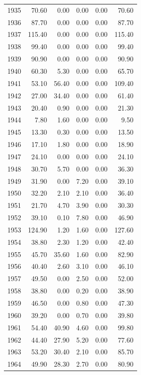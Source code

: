 \documentclass[12pt,]{article}
\begin{document}
\begin{longtable}{rrrrrr}
  1935 & 70.60 & 0.00 & 0.00 & 0.00 & 70.60 \\ 
  1936 & 87.70 & 0.00 & 0.00 & 0.00 & 87.70 \\ 
  1937 & 115.40 & 0.00 & 0.00 & 0.00 & 115.40 \\ 
  1938 & 99.40 & 0.00 & 0.00 & 0.00 & 99.40 \\ 
  1939 & 90.90 & 0.00 & 0.00 & 0.00 & 90.90 \\ 
  1940 & 60.30 & 5.30 & 0.00 & 0.00 & 65.70 \\ 
  1941 & 53.10 & 56.40 & 0.00 & 0.00 & 109.40 \\ 
  1942 & 27.00 & 34.40 & 0.00 & 0.00 & 61.40 \\ 
  1943 & 20.40 & 0.90 & 0.00 & 0.00 & 21.30 \\ 
  1944 & 7.80 & 1.60 & 0.00 & 0.00 & 9.50 \\ 
  1945 & 13.30 & 0.30 & 0.00 & 0.00 & 13.50 \\ 
  1946 & 17.10 & 1.80 & 0.00 & 0.00 & 18.90 \\ 
  1947 & 24.10 & 0.00 & 0.00 & 0.00 & 24.10 \\ 
  1948 & 30.70 & 5.70 & 0.00 & 0.00 & 36.30 \\ 
  1949 & 31.90 & 0.00 & 7.20 & 0.00 & 39.10 \\ 
  1950 & 32.20 & 2.10 & 2.10 & 0.00 & 36.40 \\ 
  1951 & 21.70 & 4.70 & 3.90 & 0.00 & 30.30 \\ 
  1952 & 39.10 & 0.10 & 7.80 & 0.00 & 46.90 \\ 
  1953 & 124.90 & 1.20 & 1.60 & 0.00 & 127.60 \\ 
  1954 & 38.80 & 2.30 & 1.20 & 0.00 & 42.40 \\ 
  1955 & 45.70 & 35.60 & 1.60 & 0.00 & 82.90 \\ 
  1956 & 40.40 & 2.60 & 3.10 & 0.00 & 46.10 \\ 
  1957 & 49.50 & 0.00 & 2.50 & 0.00 & 52.00 \\ 
  1958 & 38.80 & 0.00 & 0.20 & 0.00 & 38.90 \\ 
  1959 & 46.50 & 0.00 & 0.80 & 0.00 & 47.30 \\ 
  1960 & 39.20 & 0.00 & 0.70 & 0.00 & 39.80 \\ 
  1961 & 54.40 & 40.90 & 4.60 & 0.00 & 99.80 \\ 
  1962 & 44.40 & 27.90 & 5.20 & 0.00 & 77.60 \\ 
  1963 & 53.20 & 30.40 & 2.10 & 0.00 & 85.70 \\ 
  1964 & 49.90 & 28.30 & 2.70 & 0.00 & 80.90 \\ 

\end{longtable}
\end{document}
